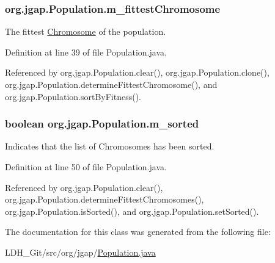 \hypertarget{classorg_1_1jgap_1_1_population_a58811aa95b2363c1078d54320fe6a252}{
\subsubsection[{m\-\_\-fittest\-Chromosome}]{ org.\-jgap.\-Population.\-m\-\_\-fittest\-Chromosome\hspace{0.3cm}{\ttfamily [private]}}}\label{classorg_1_1jgap_1_1_population_a58811aa95b2363c1078d54320fe6a252}
The fittest \hyperlink{classorg_1_1jgap_1_1_chromosome}{Chromosome} of the population. 

Definition at line 39 of file Population.\-java.



Referenced by org.\-jgap.\-Population.\-clear(), org.\-jgap.\-Population.\-clone(), org.\-jgap.\-Population.\-determine\-Fittest\-Chromosome(), and org.\-jgap.\-Population.\-sort\-By\-Fitness().

\hypertarget{classorg_1_1jgap_1_1_population_abb65c9029b8b947f25cbad4d2a5e855e}{
\subsubsection[{m\-\_\-sorted}]{\setlength{\rightskip}{0pt plus 5cm}boolean org.\-jgap.\-Population.\-m\-\_\-sorted\hspace{0.3cm}{\ttfamily [private]}}}\label{classorg_1_1jgap_1_1_population_abb65c9029b8b947f25cbad4d2a5e855e}
Indicates that the list of Chromosomes has been sorted. 

Definition at line 50 of file Population.\-java.



Referenced by org.\-jgap.\-Population.\-clear(), org.\-jgap.\-Population.\-determine\-Fittest\-Chromosomes(), org.\-jgap.\-Population.\-is\-Sorted(), and org.\-jgap.\-Population.\-set\-Sorted().



The documentation for this class was generated from the following file\-:\begin{DoxyCompactItemize}
\item 
L\-D\-H\-\_\-\-Git/src/org/jgap/\hyperlink{_population_8java}{Population.\-java}\end{DoxyCompactItemize}
